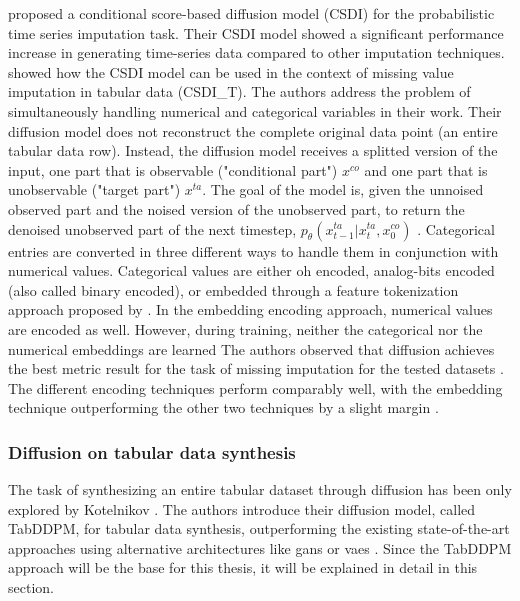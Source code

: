 \cite{tashiro2021CSDIConditionalScorebased} proposed a conditional score-based diffusion model (CSDI) for the probabilistic time series imputation task.
Their CSDI model showed a significant performance increase in generating time-series data compared to other imputation techniques.
\cite{zheng2022DiffusionModelsMissing} showed how the CSDI model can be used in the context of missing value imputation in tabular data (CSDI\_T).
The authors address the problem of simultaneously handling numerical and categorical variables in their work.
Their diffusion model does not reconstruct the complete original data point (\eg an entire tabular data row). 
Instead, the diffusion model receives a splitted version of the input, one part that is observable ("conditional part") $x^{co}$ and one part that is unobservable ("target part") $x^{ta}$.
The goal of the model is, given the unnoised observed part and the noised version of the unobserved part, to return the denoised unobserved part of the next timestep, 
\ie $p_\theta(x^{ta}_{t-1}|x^{ta}_{t},x^{co}_{0})$ \cite{zheng2022DiffusionModelsMissing}.
Categorical entries are converted in three different ways to handle them in conjunction with numerical values.
Categorical values are either \gls{oh} encoded, analog-bits encoded (also called binary encoded), or embedded through a feature tokenization approach proposed by \cite{gorishniy2021RevisitingDeepLearning}.
In the embedding encoding approach, numerical values are encoded as well. 
However, during training, neither the categorical nor the numerical embeddings are learned \cite{zheng2023DiffusionModelsMissing}
The authors observed that diffusion achieves the best metric result for the task of missing imputation for the tested datasets \cite{zheng2022DiffusionModelsMissing}.
The different encoding techniques perform comparably well, with the embedding technique outperforming the other two techniques by a slight margin \cite{zheng2022DiffusionModelsMissing}.


\subsubsection{Diffusion on tabular data synthesis}
\label{ch:relatedWork-diffusionModels-tabDDPM}

The task of synthesizing an entire tabular dataset through diffusion has been only explored by Kotelnikov \etal \cite{kotelnikov2022TabDDPMModellingTabular}.
The authors introduce their diffusion model, called TabDDPM, for tabular data synthesis, outperforming the existing state-of-the-art approaches using alternative architectures like \glspl{gan} or \glspl{vae} \cite{kotelnikov2022TabDDPMModellingTabular}. 
Since the TabDDPM approach will be the base for this thesis, it will be explained in detail in this section.

